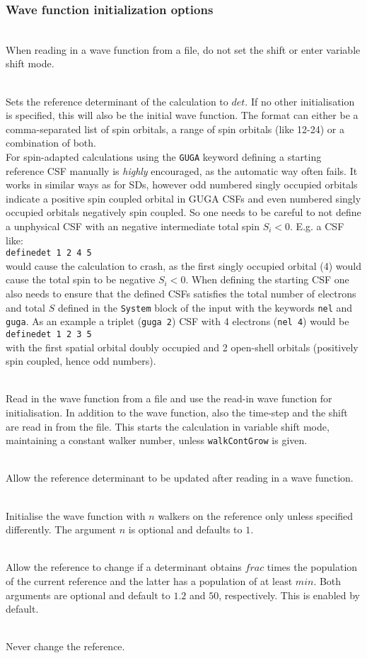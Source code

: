 \documentclass[a4paper,notitlepage,dvipsnames]{scrreprt}
\newcommand\codeitem[1]{\needspace{1.5\baselineskip}\item[\textnormal{\ttfamily #1 \nopagebreak}] \hfill \\ \nopagebreak}
\begin{document}
  \subsubsection{Wave function initialization options}
  \begin{description}
    \codeitem{\textcolor{oblue}{walkContGrow}}
    When reading in a wave function from a file, do not set the shift or enter
    variable shift mode.
    \codeitem{\textcolor{oblue}{defineDet $det$}}
    Sets the reference determinant of the calculation to $det$. If no other
    initialisation is specified, this will also be the initial
    wave function. The format can either be a comma-separated list of spin
    orbitals, a range of spin orbitals (like 12-24) or a combination of both. \\
    For spin-adapted calculations using the \texttt{GUGA} keyword defining a starting reference CSF manually is \emph{highly} encouraged, as the
  	automatic way often fails. It works in similar ways as for SDs, however
  	odd numbered singly occupied orbitals indicate a positive spin coupled orbital in GUGA CSFs and even numbered singly occupied orbitals negatively spin coupled. So one needs to be careful to not define a unphysical CSF with an negative intermediate total spin $S_i < 0$. E.g. a CSF like: \\
  	\texttt{definedet  1 2 4 5}\\
  	would cause the calculation to crash, as the first singly occupied orbital (4) would cause the total spin to be negative $S_i < 0$. When defining the starting CSF one also needs to ensure that the defined CSFs satisfies the
  	total number of electrons and total $S$ defined in the \texttt{System} block of the input with the keywords \texttt{nel} and \texttt{guga}.
  	As an example a triplet (\texttt{guga 2}) CSF with 4 electrons (\texttt{nel 4}) would be \\
  	\texttt{definedet 1 2 3 5}\\
  	with the first spatial orbital doubly occupied and 2 open-shell orbitals (positively spin coupled, hence odd numbers).

    \codeitem{readPops}
    Read in the wave function from a file and use the read-in wave function
    for initialisation. In addition to the wave function, also the time-step
    and the shift are read in from the file. This starts the calculation in
    variable shift mode, maintaining a constant walker number, unless
    \texttt{walkContGrow} is given.
    \codeitem{readpops-changeref}
    Allow the reference determinant to be updated after reading in a
    wave function.
    \codeitem{startSinglePart [$n$]}
    Initialise the wave function with $n$ walkers on the reference only unless
    specified differently. The argument $n$ is optional and defaults to $1$.
    \codeitem{proje-changeRef [$frac$ $min$]}
    Allow the reference to change if a determinant obtains $frac$ times the
    population of the current reference and the latter has a population of at
    least $min$. Both arguments are optional and default to $1.2$ and $50$,
    respectively. This is enabled by default.
    \codeitem{no-changeref}
    Never change the reference.
  \end{description}
\end{document}
